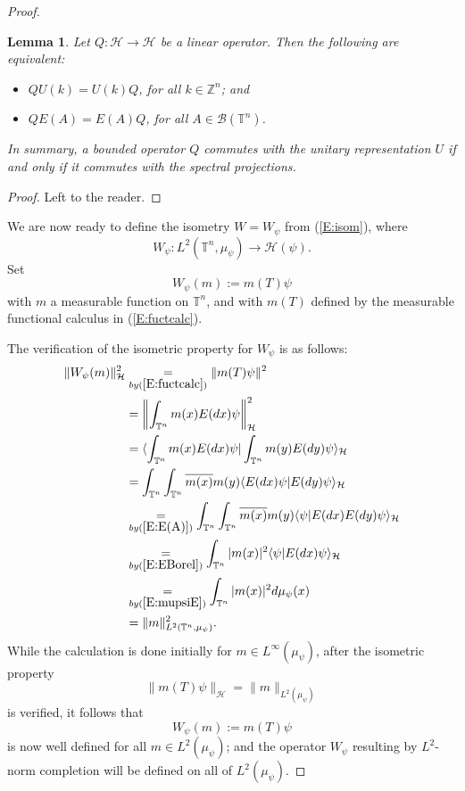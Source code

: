 \documentclass{birkmult}
\newtheorem{lem}[thm]{Lemma}
\theoremstyle{definition}
\theoremstyle{remark}
\numberwithin{equation}{section}
\begin{document}
\begin{proof}
\begin{lem}
\label{L:3.3a}
Let $Q:\mathcal{H} \to \mathcal{H}$ be a linear operator.  Then the 
following are equivalent:
\begin{itemize}
  \item[(a)] $Q U(k) = U(k)Q$, for all $k \in \mathbb{Z}^{n}$; and
  \item[(b)] $QE(A)=E(A)Q$, for all $A \in \mathcal{B}(\mathbb{T}^{n})$.
\end{itemize}
In summary, a bounded operator $Q$ commutes with the unitary representation 
$U$ if and only if it commutes with the spectral projections.
\end{lem}
\begin{proof}
Left to the reader.
\end{proof}
We are now ready to define the isometry $W=W_{\psi}$ from (\ref{E:isom}),
where
\begin{equation}
\label{E:psi1}
  W_{\psi} : L^{2}(\mathbb{T}^{n}, \mu_{\psi}) \to \mathcal{H}(\psi).
\end{equation}
Set
\begin{equation}
\label{E:psi2}
  W_{\psi}(m) := m(T)\psi
\end{equation}
with $m$ a measurable function on $\mathbb{T}^{n}$, and with $m(T)$
defined by the measurable functional calculus in (\ref{E:fuctcalc}).

The verification of the isometric property for $W_{\psi}$ is as follows:
\begin{align*}
  \|W_{\psi}(m)\|_{\mathcal{H}}^{2} &\underset{by (\ref{E:fuctcalc})}{=}
  \|m(T)\psi\|^{2} \\
  &= \left\Vert \int_{\mathbb{T}^{n}}m(x)E(dx)\psi \right\Vert_{\mathcal{H}}^{2} \\
  &= \langle \int_{\mathbb{T}^{n}}m(x)E(dx)\psi \vert \int_{\mathbb{T}^{n}}m(y)E(dy)\psi \rangle_{\mathcal{H}} \\
  &= \int_{\mathbb{T}^{n}}\int_{\mathbb{T}^{n}} \overline{m(x)}m(y)
  \langle E(dx)\psi|E(dy)\psi \rangle_{\mathcal{H}} \\
  &\underset{by (\ref{E:E(A)})}{=} \int_{\mathbb{T}^{n}}
  \int_{\mathbb{T}^{n}} \overline{m(x)}m(y)\langle \psi|E(dx)E(dy)\psi 
  \rangle_{\mathcal{H}} \\
  &\underset{by (\ref{E:EBorel})}{=} \int_{\mathbb{T}^{n}}
  |m(x)|^{2} \langle \psi|E(dx)\psi \rangle_{\mathcal{H}} \\
  &\underset{by (\ref{E:mupsiE})}{=} \int_{\mathbb{T}^{n}}|m(x)|^{2}
d\mu_{\psi}(x) \\
  &= \|m\|_{L^{2}(\mathbb{T}^{n}, \mu_{\psi})}^{2}.
\end{align*}
While the calculation is done initially for $m \in L^{\infty}(\mu_{\psi})$,
after the isometric property
\begin{equation}
\label{E:3.17}
  \|m(T)\psi\|_{\mathcal{H}}=\|m\|_{L^{2}(\mu_{\psi})}
\end{equation}
is verified, it follows that
\[
  W_{\psi}(m) := m(T)\psi
\]
is now well defined for all $m \in L^{2}(\mu_{\psi})$; and the operator
$W_{\psi}$ resulting by $L^{2}$-norm completion will be defined on all of
$L^{2}(\mu_{\psi})$.


\end{proof}
\end{document}
